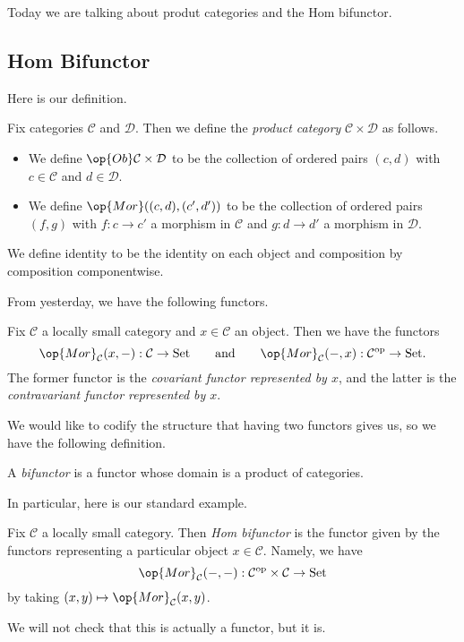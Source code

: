 
Today we are talking about produt categories and the \textrm{Hom} bifunctor.

\subsection{\textrm{Hom} Bifunctor}
Here is our definition.
\begin{definition}
	Fix categories $\mathcal C$ and $\mathcal D$. Then we define the \textit{product category} $\mathcal C\times\mathcal D$ as follows.
	\begin{itemize}
		\item We define $\op{Ob}\mathcal C\times\mathcal D$ to be the collection of ordered pairs $(c,d)$ with $c\in\mathcal C$ and $d\in\mathcal D$.
		\item We define $\op{Mor}((c,d),(c',d'))$ to be the collection of ordered pairs $(f,g)$ with $f:c\to c'$ a morphism in $\mathcal C$ and $g:d\to d'$ a morphism in $\mathcal D$.
	\end{itemize}
	We define identity to be the identity on each object and composition by composition componentwise.
\end{definition}
From yesterday, we have the following functors.
\begin{definition}
	Fix $\mathcal C$ a locally small category and $x\in\mathcal C$ an object. Then we have the functors
	\[\op{Mor}_\mathcal C(x,-):\mathcal C\to\mathrm{Set}\qquad\text{and}\qquad\op{Mor}_\mathcal C(-,x):\mathcal C^\mathrm{op}\to\mathrm{Set}.\]
	The former functor is the \textit{covariant functor represented by $x$}, and the latter is the \textit{contravariant functor represented by $x$}.
\end{definition}
We would like to codify the structure that having two functors gives us, so we have the following definition.
\begin{defi}[Bifunctor]
	A \textit{bifunctor} is a functor whose domain is a product of categories.
\end{defi}
In particular, here is our standard example.
\begin{definition}
	Fix $\mathcal C$ a locally small category. Then \textit{\textrm{Hom} bifunctor} is the functor given by the functors representing a particular object $x\in\mathcal C$. Namely, we have
	\[\op{Mor}_\mathcal C(-,-):\mathcal C^\mathrm{op}\times\mathcal C\to\mathrm{Set}\]
	by taking $(x,y)\mapsto\op{Mor}_\mathcal C(x,y)$.
\end{definition}
We will not check that this is actually a functor, but it is.


